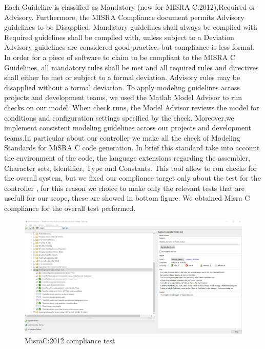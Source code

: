Each Guideline is classified as  Mandatory (new for MISRA C:2012),Required or Advisory. Furthermore, the MISRA Compliance document permits Advisory guidelines to be Disapplied. Mandatory guidelines shall always be complied with Required guidelines shall be complied with, unless subject to a Deviation Advisory guidelines are considered good practice, but compliance is less formal.
In order for a piece of software to claim to be compliant to the MISRA C Guidelines, all mandatory rules shall be met and all required rules and directives shall either be met or subject to a formal deviation. Advisory rules may be disapplied without a formal deviation. To apply modeling guidelines across projects and development teams, we used the Matlab Model Advisor to run checks on our model. When check runs, the Model Advisor reviews the model for conditions and configuration settings specified by the check. Moreover,we implement consistent modeling guidelines across our projects and development teams.In particular about our controller we make all the check of Modeling Standards for MiSRA C code generation. In brief this standard take into account the environment of the code, the language extensions regarding the assembler, Character sets, Identifier, Type and Constants. 
This tool allow to run checks for the overall system, but we fixed our compliance target only about the test for the controller , for this reason we choice to make only the relevant tests that are usefull for our scope, these are showed in bottom figure. We obtained Misra C compliance for the overall test performed.  
\\
\begin{figure}[hpt]
	\centering
	\includegraphics[width=1\textwidth]{../Images/VCS/Misra.png}
	\caption{MisraC:2012 compliance test}
	\label{misra}
\end{figure}   